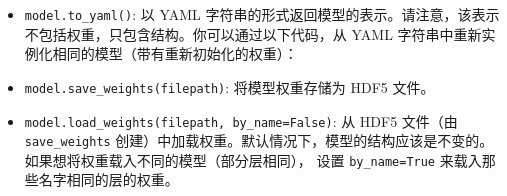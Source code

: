 \begin{itemize}
\tightlist
\item
  \texttt{model.to\_yaml()}: 以 YAML
  字符串的形式返回模型的表示。请注意，该表示不包括权重，只包含结构。你可以通过以下代码，从
  YAML 字符串中重新实例化相同的模型（带有重新初始化的权重）：
\end{itemize}

\begin{Shaded}
\begin{Highlighting}[]
  

\OperatorTok{=} 
\OperatorTok{=} 
\end{Highlighting}
\end{Shaded}

\begin{itemize}
\tightlist
\item
  \texttt{model.save\_weights(filepath)}: 将模型权重存储为 HDF5 文件。
\item
  \texttt{model.load\_weights(filepath,\ by\_name=False)}: 从 HDF5
  文件（由 \texttt{save\_weights}
  创建）中加载权重。默认情况下，模型的结构应该是不变的。
  如果想将权重载入不同的模型（部分层相同）， 设置 \texttt{by\_name=True}
  来载入那些名字相同的层的权重。
\end{itemize}

